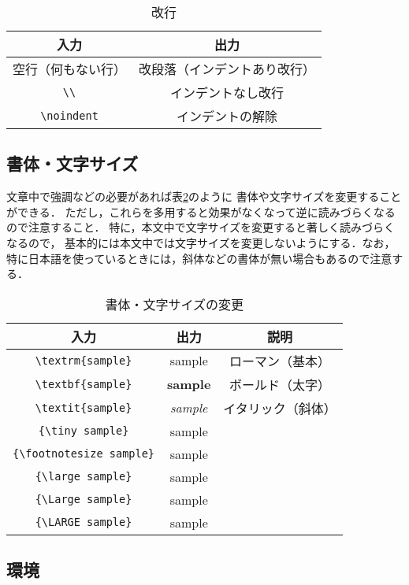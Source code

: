    \begin{table}[h]
       \caption{改行}
       \label{return}
       \centering
       \begin{tabular}{c|c}
           入力 & 出力　\\ \hline
           空行（何もない行）& 改段落（インデントあり改行）\\
           \verb|\\| & インデントなし改行 \\
           \verb|\noindent| & インデントの解除
       \end{tabular}
   \end{table}

\subsection{書体・文字サイズ}

文章中で強調などの必要があれば表\ref{style_size}のように
書体や文字サイズを変更することができる．
ただし，これらを多用すると効果がなくなって逆に読みづらくなるので注意すること．
特に，本文中で文字サイズを変更すると著しく読みづらくなるので，
基本的には本文中では文字サイズを変更しないようにする．なお，
特に日本語を使っているときには，斜体などの書体が無い場合もあるので注意する．

   \begin{table}[h]
       \caption{書体・文字サイズの変更}
       \label{style_size}
       \centering
       \begin{tabular}{c|c|c}
           入力 & 出力 & 説明　\\ \hline
           \verb|\textrm{sample}| & \textrm{sample} & ローマン（基本）\\
           \verb|\textbf{sample}| & \textbf{sample} & ボールド（太字）\\
           \verb|\textit{sample}| & \textit{sample} & イタリック（斜体） \\
           \verb|{\tiny sample}| & {\tiny sample} & \\
           \verb|{\footnotesize sample}| & {\footnotesize sample} & \\
           \verb|{\large sample}| & {\large sample} & \\
           \verb|{\Large sample}| & {\Large sample} & \\
           \verb|{\LARGE sample}| & {\LARGE sample} &
       \end{tabular}
   \end{table}


\subsection{環境}

